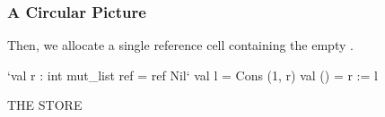 \documentclass[aspectratio=169, handout]{beamer}
\newcommand{\topthing}[2]{
      \begin{minipage}[t][#1][t]{\textwidth}
        \vspace{\fill}
        #2
        \vspace{\fill}
      \end{minipage}
    }
\begin{document}
\begin{frame}[fragile]
  \frametitle{A Circular Picture}

  \topthing{0.2in}{
    Then, we allocate a single reference cell containing the empty \code{mut_list}.
  }

  \vspace{10pt}

  \begin{center}
    \begin{minipage}[t][2.1in][t]{0.55\textwidth}
      \vspace{\fill}
      \small
      \begin{codeblock}
        `val r : int mut_list ref = ref Nil`
        val l = Cons (1, r)
        val () = r := l
      \end{codeblock}
      \vspace{\fill}
    \end{minipage}
    \hfill\vline\hfill
    \begin{minipage}[t][2.1in][t]{0.35\textwidth}
      \centering
      {\hspace{-20pt}\color{gray} \large THE STORE}

      \vspace{\fill}
      \vspace{\fill}
    \end{minipage}
  \end{center}
\end{frame}
\end{document}
